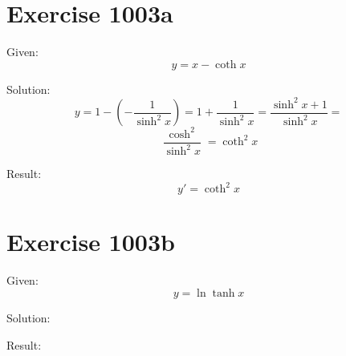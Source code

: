 \documentclass[a4paper, 10pt]{scrartcl}
\begin{document}
\section{Exercise 1003a}

Given:
\[
y = x - \coth{x}
\]

Solution:
\[
y = 1 - \left(-\frac{1}{\sinh^{2}{x}}\right) = 1 + \frac{1}{\sinh^{2}{x}} = \frac{\sinh^{2}{x} + 1}{\sinh^{2}{x}} =
\]
\[
\frac{\cosh^{2}}{\sinh^{2}{x}} = \coth^{2}{x}
\]

Result:
\[
y' = \coth^{2}{x}
\]

\section{Exercise 1003b}

Given:
\[
y = \ln{\tanh{x}}
\]

Solution:

Result:
\end{document}

